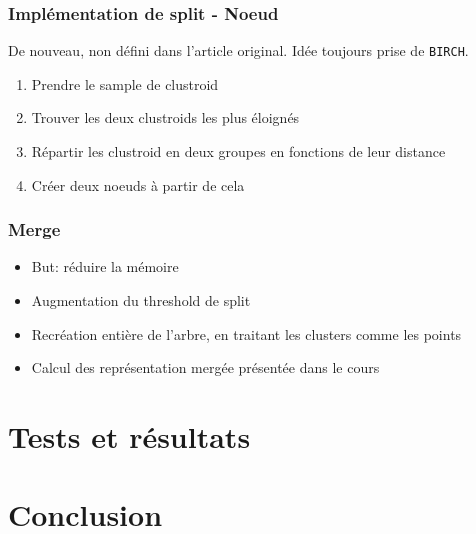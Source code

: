 \documentclass{beamer}
\begin{document}
 	\begin{frame}
 		\frametitle{Implémentation de split - Noeud}
 		De nouveau, non défini dans l'article original. Idée toujours prise de \texttt{BIRCH}.
 		\begin{enumerate}
 			\item Prendre le sample de clustroid
 			\item Trouver les deux clustroids les plus éloignés
 			\item Répartir les clustroid en deux groupes en fonctions de leur distance
 			\item Créer deux noeuds à partir de cela
 		\end{enumerate}
 	\end{frame}
 	
 	\begin{frame}
 		\frametitle{Merge}
 		\begin{itemize}
 			\item But: réduire la mémoire
 			\item Augmentation du threshold de split
 			\item Recréation entière de l'arbre, en traitant les clusters comme les points
 			\item Calcul des représentation mergée présentée dans le cours
 		\end{itemize}
 	\end{frame}
 	
 	\section{Tests et résultats}
 	\section{Conclusion}
\end{document}
